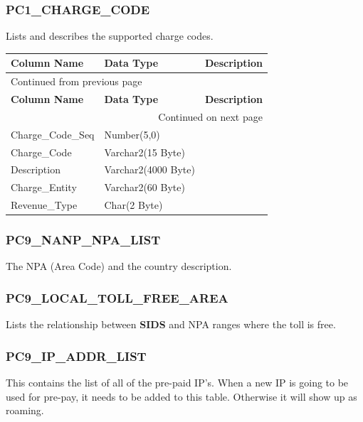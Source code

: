 \documentclass[12pt,twoside]{article}
\begin{document}
\subsubsection{PC1\_CHARGE\_CODE}
\label{sec:orgheadline128}
Lists and describes the supported charge codes.
\footnotesize

\begin{longtable}{l|l|l}
\hline
\textbf{Column Name} & \textbf{Data Type} & \textbf{Description}\\
\hline
\endfirsthead
\multicolumn{3}{l}{Continued from previous page} \\
\hline

\textbf{Column Name} & \textbf{Data Type} & \textbf{Description} \\

\hline
\endhead
\hline\multicolumn{3}{r}{Continued on next page} \\
\endfoot
\endlastfoot
\hline
Charge\_Code\_Seq & Number(5,0) & \\
Charge\_Code & Varchar2(15 Byte) & \\
Description & Varchar2(4000 Byte) & \\
Charge\_Entity & Varchar2(60 Byte) & \\
Revenue\_Type & Char(2 Byte) & \\
\hline
\end{longtable}

\normalsize
\subsubsection{PC9\_NANP\_NPA\_LIST}
\label{sec:orgheadline129}
The NPA (Area Code) and the country description.
\subsubsection{PC9\_LOCAL\_TOLL\_FREE\_AREA}
\label{sec:orgheadline130}
Lists the relationship between \textbf{SIDS} and NPA ranges where the toll is free.
\subsubsection{PC9\_IP\_ADDR\_LIST}
\label{sec:orgheadline131}
This contains the list of all of the pre-paid IP's. When a new IP is going to be used for pre-pay, it needs to be added to this table. Otherwise it will show up as roaming.
\footnotesize
\end{document}
